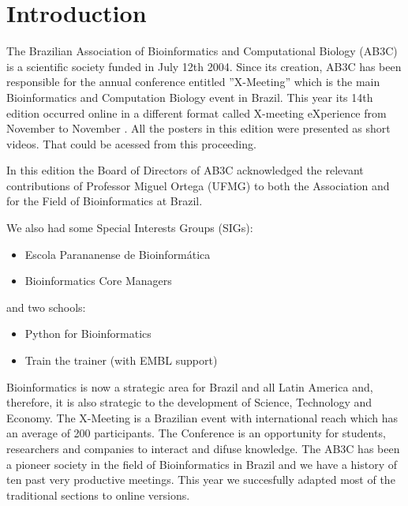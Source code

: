 \newpage
\chapter{Introduction}
The Brazilian Association of Bioinformatics and Computational Biology (AB3C) is
a scientific society funded in July 12th 2004.
Since its creation, AB3C has been responsible for the annual conference entitled
''X-Meeting'' which is the main Bioinformatics and Computation Biology event in
Brazil. This year its 14th edition occurred online in a different format 
called X-meeting eXperience from November  to November . All the
posters in this edition were presented as short videos. That could be acessed
from this proceeding.

In this edition the Board of Directors of AB3C acknowledged the relevant
contributions of Professor  Miguel Ortega (UFMG) to both the Association and for
the Field of Bioinformatics at Brazil.

We also had some Special Interests Groups (SIGs):
\begin{itemize}
\item Escola Parananense de Bioinformática
  \item Bioinformatics Core Managers 
  \end{itemize}
  and two schools:
  \begin{itemize}
  \item Python for Bioinformatics
    \item Train the trainer (with EMBL support)
    \end{itemize}
  
	
Bioinformatics is now a strategic area for Brazil and all Latin America and,
therefore, it is also strategic to the development of Science, Technology and
Economy. The X-Meeting is a Brazilian event with international reach which has
an average of 200 participants. The Conference is an opportunity for students,
researchers and companies to interact and difuse knowledge. The AB3C has been a
pioneer society in the field of Bioinformatics in Brazil and we have a history
of ten past very productive meetings. This year we succesfully adapted most of
the traditional sections to online versions. 

%
%
